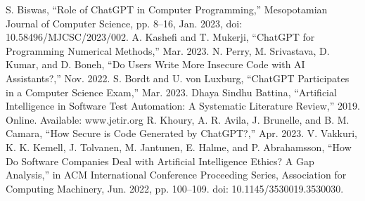\documentclass[conference]{IEEEtran}
\begin{document}
\begin{thebibliography}{00}
 S. Biswas, “Role of ChatGPT in Computer Programming,” Mesopotamian Journal of Computer Science, pp. 8–16, Jan. 2023, doi: 10.58496/MJCSC/2023/002. 
 A. Kashefi and T. Mukerji, “ChatGPT for Programming Numerical Methods,” Mar. 2023. 
 N. Perry, M. Srivastava, D. Kumar, and D. Boneh, “Do Users Write More Insecure Code with AI Assistants?,” Nov. 2022. 
 S. Bordt and U. von Luxburg, “ChatGPT Participates in a Computer Science Exam,” Mar. 2023. 
 Dhaya Sindhu Battina, “Artificial Intelligence in Software Test Automation: A Systematic Literature Review,” 2019. {Online}. Available: www.jetir.org 
 R. Khoury, A. R. Avila, J. Brunelle, and B. M. Camara, “How Secure is Code Generated by ChatGPT?,” Apr. 2023. 
 V. Vakkuri, K. K. Kemell, J. Tolvanen, M. Jantunen, E. Halme, and P. Abrahamsson, “How Do Software Companies Deal with Artificial Intelligence Ethics? A Gap Analysis,” in ACM International Conference Proceeding Series, Association for Computing Machinery, Jun. 2022, pp. 100–109. doi: 10.1145/3530019.3530030.
\end{thebibliography}
\end{document}
